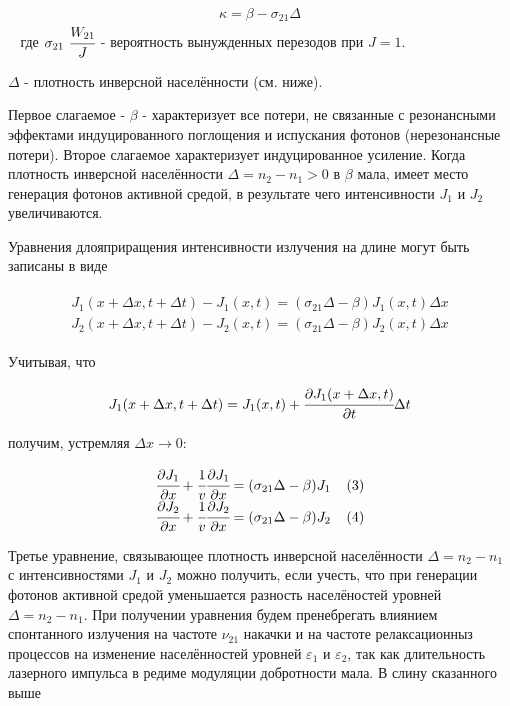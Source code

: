 \documentclass[a4paper,14pt,russian]{article}
\begin{document}
\begin{eqnarray}
\kappa = \beta - \sigma_{21} \Delta
\end{eqnarray}
$\;\;$ где $\sigma_{21} \ \cfrac {W_{21}} {J}$ - вероятность вынужденных перезодов при $J = 1.$

$\Delta$ - плотность инверсной населённости (см. ниже).

Первое слагаемое - $\beta$ - характеризует все потери, не связанные с резонансными эффектами индуцированного поглощения и испускания фотонов (нерезонансные потери). Второе слагаемое характеризует индуцированное усиление. Когда плотность инверсной населённости $\Delta = n_2 - n_1 > 0$ в $\beta$ мала, имеет место генерация фотонов активной средой, в результате чего интенсивности $J_1$ и $J_2$ увеличиваются.

Уравнения длояприращения интенсивности излучения на длине могут быть записаны в виде

\begin{eqnarray}
\left . \begin{matrix}
J_1 (x + \Delta x, t + \Delta t) - J_1(x, t) = (\sigma_{21} \Delta - \beta) J_1 (x, t) \Delta x \\
J_2 (x + \Delta x, t + \Delta t) - J_2(x, t) = (\sigma_{21} \Delta - \beta) J_2 (x, t) \Delta x
\end{matrix} \right.
\end{eqnarray}

Учитывая, что

\begin{eqnarray}
J_1(x + \Delta x, t + \Delta t) = J_1(x, t) + \cfrac {\partial J_1 (x + \Delta x, t)} {\partial t} \Delta t
\end{eqnarray}

получим, устремляя $\Delta x \to 0$:

\begin{eqnarray}
\left . \begin{matrix}
\cfrac {\partial J_1} {\partial x} + \cfrac {1} {v} \cfrac {\partial J_1} {\partial x} = (\sigma_{21} \Delta - \beta) J_1 \;\;\;\; (3) \\
\cfrac {\partial J_2} {\partial x} + \cfrac {1} {v} \cfrac {\partial J_2} {\partial x} = (\sigma_{21} \Delta - \beta) J_2 \;\;\;\; (4)
\end{matrix} \right.
\end{eqnarray}

Третье уравнение, связывающее плотность инверсной населённости $\Delta = n_2 - n_1$ с интенсивностями $J_1$ и $J_2$ можно получить, если учесть, что при генерации фотонов активной средой уменьшается разность населёностей уровней $\Delta = n_2 - n_1$. При получении уравнения будем пренебрегать влиянием спонтанного излучения на частоте $\nu_{21}$ накачки и на частоте релаксационныз процессов на изменение населённостей уровней $\varepsilon_1$ и $\varepsilon_2$, так как длительность лазерного импульса в редиме модуляции добротности мала. В слину сказанного выше
\end{document}

